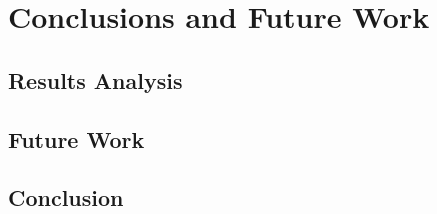 

\chapter{Conclusions and Future Work}
\label{cha:conclusions_and_future_work}

\section{Results Analysis}
\label{sec:results_analysis}

\section{Future Work}
\label{sec:future_work}

\section{Conclusion} %
\label{sec:conclusion}
